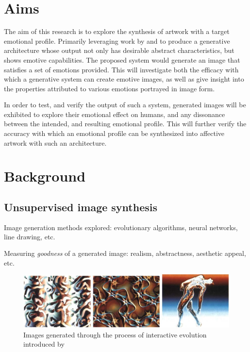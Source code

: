 \documentclass{article}
\begin{document}
\section{Aims}

The aim of this research is to explore the synthesis of artwork with a target emotional profile.
Primarily leveraging work by \citet{tan2017artgan} and \citet{kim2018building} to produce a generative architecture whose output not only has desirable abstract characteristics, but shows emotive capabilities.
The proposed system would generate an image that satisfies a set of emotions provided.
This will investigate both the efficacy with which a generative system can create emotive images, as well as give insight into the properties attributed to various emotions portrayed in image form.

In order to test, and verify the output of such a system, generated images will be exhibited to explore their emotional effect on humans, and any dissonance between the intended, and resulting emotional profile.
This will further verify the accuracy with which an emotional profile can be synthesized into affective artwork with such an architecture.


\section{Background}

\subsection{Unsupervised image synthesis}
\begin{todolist}
	\item Image generation methods explored: evolutionary algorithms, neural networks, line drawing, etc.
	\item Measuring \textit{goodness} of a generated image: realism, abstractness, aesthetic appeal, etc.
\end{todolist}

\begin{figure}[h!]
	\includegraphics[width=\textwidth]{images/sims-interactive-image-generation.png}
	\caption{Images generated through the process of interactive evolution introduced by \citet{sims}}
	\label{fig:sims}
\end{figure}
\end{document}
